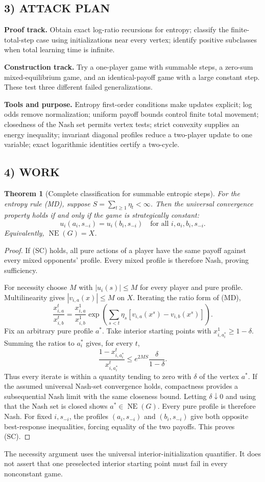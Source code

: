 \documentclass[11pt,a4paper]{article}
\newcommand{\NE}{\operatorname{NE}}
\newtheorem{theorem}{Theorem}[section]
\theoremstyle{definition}
\theoremstyle{remark}
\begin{document}
\subsection*{3) ATTACK PLAN}
\textbf{Proof track.} Obtain exact log-ratio recursions for entropy; classify the
finite-total-step case using initializations near every vertex; identify positive
subclasses when total learning time is infinite.

\textbf{Construction track.} Try a one-player game with summable steps, a zero-sum
mixed-equilibrium game, and an identical-payoff game with a large constant step.
These test three different failed generalizations.

\textbf{Tools and purpose.} Entropy first-order conditions make updates explicit;
log odds remove normalization; uniform payoff bounds control finite total movement;
closedness of the Nash set permits vertex tests; strict convexity supplies an
energy inequality; invariant diagonal profiles reduce a two-player update to one
variable; exact logarithmic identities certify a two-cycle.

\subsection*{4) WORK}
\begin{theorem}[Complete classification for summable entropic steps]
For the entropy rule (MD), suppose $S=\sum_{t\geq1}\eta_t<\infty$. Then the universal
convergence property holds if and only if the game is strategically constant:
\[
 u_i(a_i,s_{-i})=u_i(b_i,s_{-i})
 \quad\text{for all }i,a_i,b_i,s_{-i}.
 \tag{SC}
\]
Equivalently, $\NE(G)=X$.
\end{theorem}
\begin{proof}
If (SC) holds, all pure actions of a player have the same payoff against every
mixed opponents' profile. Every mixed profile is therefore Nash, proving sufficiency.

For necessity choose $M$ with $|u_i(s)|\leq M$ for every player and pure profile.
Multilinearity gives $|v_{i,a}(x)|\leq M$ on $X$. Iterating the ratio form of (MD),
\[
 \frac{x_{i,a}^{t}}{x_{i,b}^{t}}
 =\frac{x_{i,a}^{1}}{x_{i,b}^{1}}
   \exp\left(\sum_{s<t}\eta_s[v_{i,a}(x^s)-v_{i,b}(x^s)]\right).
\]
Fix an arbitrary pure profile $a^*$. Take interior starting points with
$x_{i,a_i^*}^{1}\geq1-\delta$. Summing the ratios to $a_i^*$ gives, for every $t$,
\[
 \frac{1-x_{i,a_i^*}^{t}}{x_{i,a_i^*}^{t}}
 \leq e^{2MS}\frac{\delta}{1-\delta}.
\]
Thus every iterate is within a quantity tending to zero with $\delta$ of the
vertex $a^*$. If the assumed universal Nash-set convergence holds, compactness
provides a subsequential Nash limit with the same closeness bound. Letting
$\delta\downarrow0$ and using that the Nash set is closed shows $a^*\in\NE(G)$.
Every pure profile is therefore Nash. For fixed $i,s_{-i}$, the profiles
$(a_i,s_{-i})$ and $(b_i,s_{-i})$ give both opposite best-response inequalities,
forcing equality of the two payoffs. This proves (SC).
\end{proof}
The necessity argument uses the universal interior-initialization quantifier.
It does not assert that one preselected interior starting point must fail in every
nonconstant game.
\end{document}
